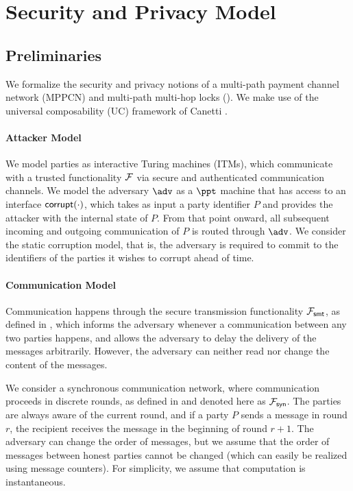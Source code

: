 \section{Security and Privacy Model}
\label{sec:security-model}

\subsection{Preliminaries}
\label{sec:model-prelims}

We formalize the security and privacy notions of a multi-path payment channel network (MPPCN) 
and multi-path multi-hop locks (\sysname). We make use of the universal composability (UC) 
framework of Canetti \cite{canetti}.

\paragraph{Attacker Model}
We model parties as interactive Turing machines (ITMs), which communicate with a trusted 
functionality $\mathcal{F}$ via secure and authenticated communication channels. We model the 
adversary $\adv$ as a $\ppt$ machine that has access to an interface $\mathsf{corrupt}(\cdot)$, 
which takes as input a party identifier $P$ and provides the attacker with the internal 
state of $P$. From that point onward, all subsequent incoming and outgoing communication 
of $P$ is routed through $\adv$. We consider the static corruption model, that is, the 
adversary is required to commit to the identifiers of the parties it wishes to corrupt 
ahead of time.

\paragraph{Communication Model}
Communication happens through the secure transmission functionality $\mathcal{F}_{\mathsf{smt}}$, as 
defined in \cite{canetti}, which informs the adversary whenever a communication between 
any two parties happens, and allows the adversary to delay the delivery of the messages 
arbitrarily. However, the adversary can neither read nor change the content of the messages.

We consider a synchronous communication network, where communication proceeds in discrete 
rounds, as defined in \cite{kmtz} and denoted here as $\mathcal{F}_{\mathsf{syn}}$. The parties are 
always aware of the current round, and if a party $P$ sends a message in round $r$, 
the recipient receives the message in the beginning of round $r + 1$. The 
adversary can change the order of messages, but we assume that the order of messages 
between honest parties cannot be changed (which can easily be realized using message 
counters). For simplicity, we assume that computation is instantaneous.

